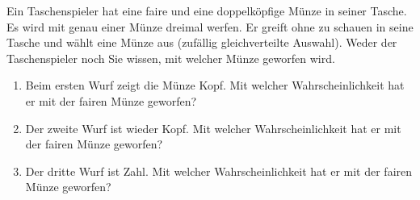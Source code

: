 \begin{exercisePage}
	\begin{homework}
		Ein Taschenspieler hat eine faire und eine doppelköpfige Münze in seiner Tasche. Es wird mit genau einer Münze dreimal werfen. Er greift ohne zu schauen in seine Tasche und wählt eine Münze aus (zufällig gleichverteilte Auswahl). Weder der Taschenspieler noch Sie wissen, mit welcher Münze geworfen wird.
		\begin{enumerate}[leftmargin=*, label=(\alph*), nolistsep, topsep=-\baselineskip]
			\item Beim ersten Wurf zeigt die Münze Kopf. Mit welcher Wahrscheinlichkeit hat er mit der fairen Münze geworfen?
			\item Der zweite Wurf ist wieder Kopf. Mit welcher Wahrscheinlichkeit hat er mit der fairen Münze geworfen?
			\item Der dritte Wurf ist Zahl. Mit welcher Wahrscheinlichkeit hat er mit der fairen Münze geworfen?
		\end{enumerate}
	\end{homework}


\end{exercisePage}
